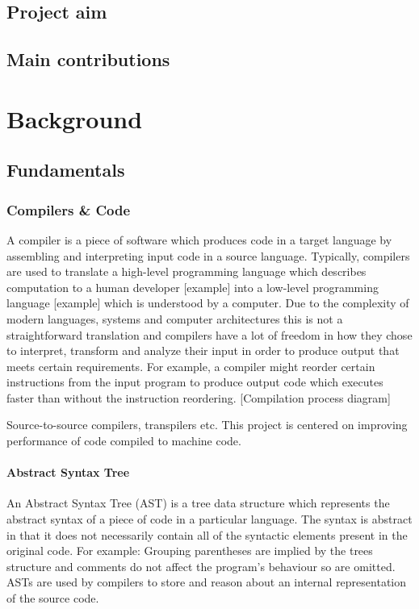 \documentclass[a4paper,12pt,twoside]{report}
\begin{document}
\section{Project aim}
\section{Main contributions}
\chapter{Background}

\section{Fundamentals}
\subsection{Compilers \& Code}
A compiler is a piece of software which produces code in a target language by assembling and interpreting input code in a source language.
Typically, compilers are used to translate a high-level programming language which describes computation to a human developer [example] into 
a low-level programming language [example] which is understood by a computer. Due to the complexity of modern languages, systems and computer
architectures this is not a straightforward translation and compilers have a lot of freedom in how they chose to interpret, transform and analyze
their input in order to produce output that meets certain requirements. For example, a compiler might reorder certain instructions from the input
program to produce output code which executes faster than without the instruction reordering.
[Compilation process diagram]

Source-to-source compilers, transpilers etc. This project is centered on improving performance of code compiled to machine code.

\subsubsection{Abstract Syntax Tree}
An Abstract Syntax Tree (AST) is a tree data structure which represents the abstract syntax of a piece of
code in a particular language. The syntax is abstract in that it does not necessarily contain all of the
syntactic elements present in the original code. For example: Grouping parentheses are implied by the
trees structure and comments do not affect the program's behaviour so are omitted. ASTs are used 
by compilers to store and reason about an internal representation of the source code.
\end{document}
